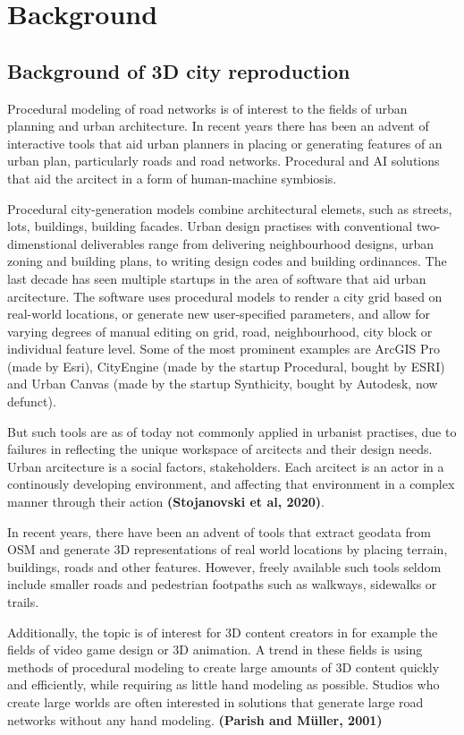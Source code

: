 \documentclass{kththesis}
\begin{document}
\chapter{Background}

\section{Background of 3D city reproduction}

Procedural modeling of road networks is of interest to the fields of urban planning and urban architecture. In recent years there has been an advent of interactive tools that aid urban planners in placing or generating features of an urban plan, particularly roads and road networks. Procedural and AI solutions that aid the arcitect in a form of human-machine symbiosis.

Procedural city-generation models combine architectural elemets, such as streets, lots, buildings, building facades.
Urban design practises with conventional two-dimenstional deliverables range from delivering neighbourhood designs, urban zoning and building plans, to writing design codes and building ordinances.
The last decade has seen multiple startups in the area of software that aid urban arcitecture. The software uses procedural models to render a city grid based on real-world locations, or generate new user-specified parameters, and allow for varying degrees of manual editing on grid, road, neighbourhood, city block or individual feature level.
Some of the most prominent examples are ArcGIS Pro (made by Esri), CityEngine (made by the startup Procedural, bought by ESRI) and Urban Canvas (made by the startup Synthicity, bought by Autodesk, now defunct).

But such tools are as of today not commonly applied in urbanist practises, due to failures in reflecting the unique workspace of arcitects and their design needs. Urban arcitecture is a social factors, stakeholders. Each arcitect is an actor in a continously developing environment, and affecting that environment in a complex manner through their action \textbf{(Stojanovski et al, 2020)}.

In recent years, there have been an advent of tools that extract geodata from OSM and generate 3D representations of real world locations by placing terrain, buildings, roads and other features.
However, freely available such tools seldom include smaller roads and pedestrian footpaths such as walkways, sidewalks or trails.

Additionally, the topic is of interest for 3D content creators in for example the fields of video game design or 3D animation. A trend in these fields is using methods of procedural modeling to create large amounts of 3D content quickly and efficiently, while requiring as little hand modeling as possible. Studios who create large worlds are often interested in solutions that generate large road networks without any hand modeling. \textbf{(Parish and Müller, 2001)}
\end{document}
